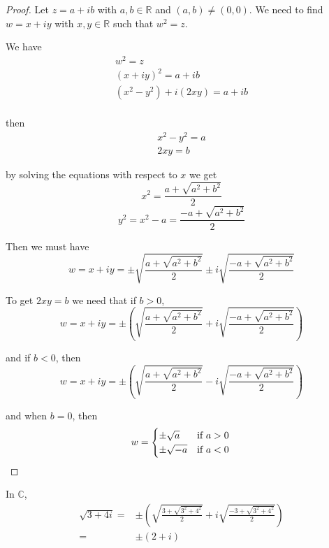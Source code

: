 \begin{proof}
Let $z = a+ib$ with $a,b\in\mathbb{R}$ and $(a,b)\neq (0,0)$. We need to find $w = x + iy$ with $x,y\in\mathbb{R}$ such that $w^2 = z$.

We have \begin{gather*}
    w^2 = z\\
    (x+iy)^2 = a+ib \\
    (x^2-y^2) + i(2xy) = a + ib\\
\end{gather*}

then \begin{gather*}
    x^2-y^2 = a\\
    2xy = b
\end{gather*}

by solving the equations with respect to $x$ we get 
\[x^2 = \frac{a + \sqrt{a^2+b^2}}{2}\]
\[y^2 = x^2-a = \frac{-a + \sqrt{a^2+b^2}}{2}\]

Then we must have \[w = x + iy = \pm \sqrt{\frac{a + \sqrt{a^2+b^2}}{2}} \pm i \sqrt{\frac{-a + \sqrt{a^2+b^2}}{2}} \]

To get $2xy = b$ we need that if $b>0$, \[w = x + iy = \pm \left( \sqrt{\frac{a + \sqrt{a^2+b^2}}{2}} + i \sqrt{\frac{-a + \sqrt{a^2+b^2}}{2}} \right)\]

and if $b < 0$, then \[w = x + iy = \pm \left( \sqrt{\frac{a + \sqrt{a^2+b^2}}{2}} - i \sqrt{\frac{-a + \sqrt{a^2+b^2}}{2}} \right)\]


and when $b = 0$, then \[w = \begin{cases} \pm \sqrt{a} & \text{if } a > 0 \\ \pm \sqrt{-a} & \text{if } a<0  \end{cases}\qedhere\]
\end{proof}

\begin{exmp}
    In $\mathbb{C}$, \begin{align*}
        \sqrt{3+4i} = & \pm \left( \sqrt{\frac{3 + \sqrt{3^2+4^2}}{2}} + i \sqrt{\frac{-3 + \sqrt{3^2+4^2}}{2}} \right)\\ =& \pm (2+i)
    \end{align*}
\end{exmp}







